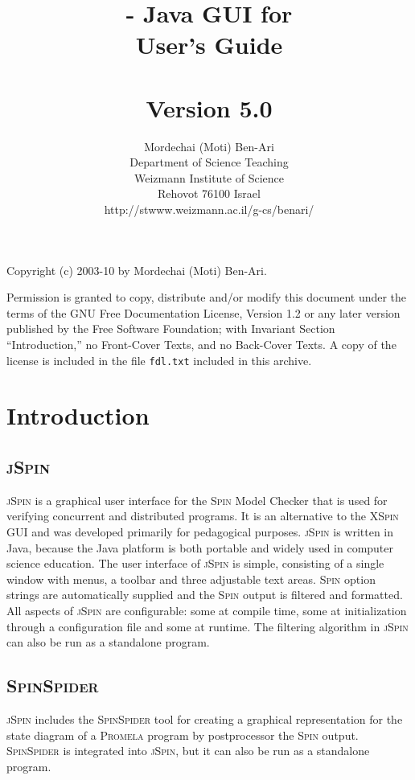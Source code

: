 \documentclass[11pt]{article}
\title{\js{} - Java GUI for \spn{}\\User's Guide\\\mbox{}\\\large{Version 5.0}}
\author{Mordechai (Moti) Ben-Ari\\
Department of Science Teaching\\
Weizmann Institute of Science\\
Rehovot 76100 Israel\\
\textsf{http://stwww.weizmann.ac.il/g-cs/benari/}}
\newcommand{\spn}{\textsc{Spin}}
\newcommand{\prm}{\textsc{Promela}}
\newcommand{\js}{\textsc{jSpin}}
\newcommand{\spd}{\textsc{SpinSpider}}
\newcommand{\p}[1]{\texttt{#1}}
\begin{document}
\maketitle
\thispagestyle{empty}

\vfill

\begin{center}
Copyright (c) 2003-10 by Mordechai (Moti) Ben-Ari.
\end{center}
Permission is granted to copy, distribute and/or modify this document
under the terms of the GNU Free Documentation License, Version 1.2
or any later version published by the Free Software Foundation;
with Invariant Section ``Introduction,'' no Front-Cover Texts, and no
Back-Cover Texts. A copy of the license is included in the file
\p{fdl.txt} included in this archive.
\newpage

\section{Introduction}

\subsection{\js{}}
\js{} is a graphical user interface for the \spn{} Model Checker that is
used for verifying concurrent and distributed programs. It is an
alternative to the \textsc{XSpin} GUI and was developed primarily for
pedagogical purposes. \js{} is written in Java, because the Java
platform is both portable and widely used in computer science education.
The user interface of \js{} is simple, consisting of a single window
with menus, a toolbar and three adjustable text areas. \spn{} option
strings are automatically supplied and the \spn{} output is filtered and
formatted. All aspects of \js{} are configurable: some at compile time,
some at initialization through a configuration file and some at runtime.
The filtering algorithm in \js{} can also be run as a standalone
program.

\subsection{\spd{}}
\js{} includes the \spd{} tool for creating a graphical representation for
the state diagram of a \prm{} program by postprocessor the \spn{} output. 
\spd{} is integrated into \js{}, but it can also be run as a standalone program.
\end{document}
